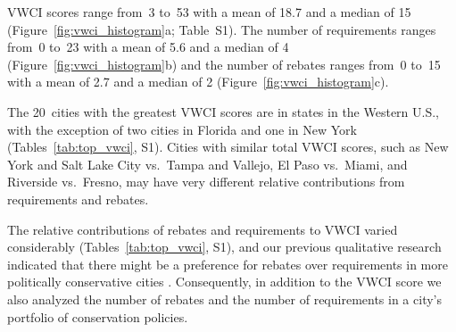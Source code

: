 \documentclass[draft,linenumbers]{agujournal}
\begin{document}
VWCI scores range from~3
to~53
with a mean of  18.7
and a median of 15
(Figure~\ref{fig:vwci_histogram}a; Table~S1).
The number of requirements ranges
from~0
to~23
with a mean of 5.6
and a median of 4
(Figure~\ref{fig:vwci_histogram}b) and the number of rebates ranges
from~0
to~15
with a mean of 2.7
and a median of 2
(Figure~\ref{fig:vwci_histogram}c).
%
%

The 20~cities with the greatest VWCI scores are in states in the
Western U.S., with the exception of two cities in Florida and one in New York
(Tables~\ref{tab:top_vwci}, S1). Cities with similar total VWCI scores, such as
New York and Salt Lake City vs.\ Tampa and Vallejo, El Paso vs.\ Miami, and
Riverside vs.\ Fresno, may have very different relative contributions from
requirements and rebates.

The relative contributions of rebates and requirements to VWCI varied
considerably (Tables~\ref{tab:top_vwci}, S1), and our previous qualitative research
indicated that there might be a preference for rebates over requirements in more
politically conservative cities \citep{hess:drought:2016,brown:politics:2016}.
Consequently, in addition to the VWCI score we also analyzed the number of
rebates and the number of requirements in a city's portfolio of conservation
policies.
\end{document}
